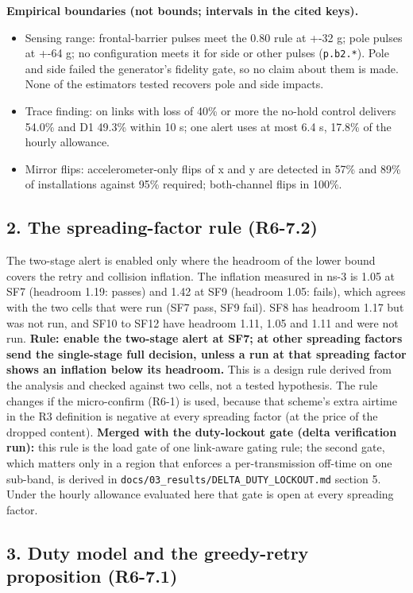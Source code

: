 \textbf{Empirical boundaries (not bounds; intervals in the cited keys).}
\begin{itemize}
\item Sensing range: frontal-barrier pulses meet the 0.80 rule at +-32 g; pole pulses at +-64 g; no configuration meets it for side or other pulses (\texttt{p.b2.*}). Pole and side failed the generator's fidelity gate, so no claim about them is made. None of the estimators tested recovers pole and side impacts.
\item Trace finding: on links with loss of 40\% or more the no-hold control delivers 54.0\% and D1 49.3\% within 10 s; one alert uses at most 6.4 s, 17.8\% of the hourly allowance.
\item Mirror flips: accelerometer-only flips of x and y are detected in 57\% and 89\% of installations against 95\% required; both-channel flips in 100\%.
\end{itemize}

\subsection*{2. The spreading-factor rule (R6-7.2)}

The two-stage alert is enabled only where the headroom of the lower bound covers the retry and collision inflation. The inflation measured in ns-3 is 1.05 at SF7 (headroom 1.19: passes) and 1.42 at SF9 (headroom 1.05: fails), which agrees with the two cells that were run (SF7 pass, SF9 fail). SF8 has headroom 1.17 but was not run, and SF10 to SF12 have headroom 1.11, 1.05 and 1.11 and were not run. \textbf{Rule: enable the two-stage alert at SF7; at other spreading factors send the single-stage full decision, unless a run at that spreading factor shows an inflation below its headroom.} This is a design rule derived from the analysis and checked against two cells, not a tested hypothesis. The rule changes if the micro-confirm (R6-1) is used, because that scheme's extra airtime in the R3 definition is negative at every spreading factor (at the price of the dropped content). \textbf{Merged with the duty-lockout gate (delta verification run):} this rule is the load gate of one link-aware gating rule; the second gate, which matters only in a region that enforces a per-transmission off-time on one sub-band, is derived in \texttt{docs/03\_results/DELTA\_DUTY\_LOCKOUT.md} section 5. Under the hourly allowance evaluated here that gate is open at every spreading factor.

\subsection*{3. Duty model and the greedy-retry proposition (R6-7.1)}

